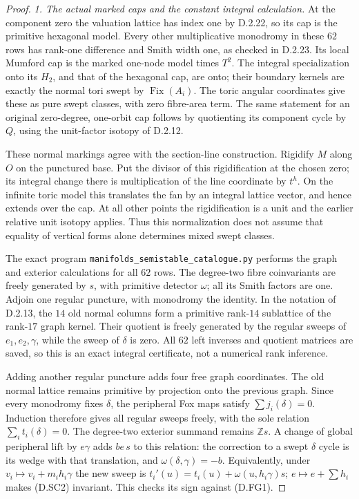 \begin{proof}
\emph{1. The actual marked caps and the constant integral calculation.}
At the component zero the valuation lattice has index one by D.2.22,
so its cap is the primitive hexagonal model. Every other
multiplicative monodromy in these $62$ rows has rank-one difference
and Smith width one, as checked in D.2.23. Its local Mumford cap is
the marked one-node model times $T^2$. The integral specialization
onto its $H_2$, and that of the hexagonal cap, are onto; their
boundary kernels are exactly the normal tori swept by
$\operatorname{Fix}(A_i)$. The toric angular coordinates give these
as pure swept classes, with zero fibre-area term. The same statement
for an original zero-degree, one-orbit cap follows by quotienting
its component cycle by $Q$, using the unit-factor isotopy of D.2.12.

These normal markings agree with the section-line construction.
Rigidify $M$ along $O$ on the punctured base. Put the divisor of this
rigidification at the chosen zero; its integral change there is
multiplication of the line coordinate by $t^h$. On the infinite
toric model this translates the fan by an integral lattice vector,
and hence extends over the cap. At all other points the
rigidification is a unit and the earlier relative unit isotopy
applies. Thus this normalization does not assume that equality of
vertical forms alone determines mixed swept classes.

The exact program \texttt{manifolds\_semistable\_catalogue.py}
performs the graph and exterior calculations for all $62$ rows.
The degree-two fibre coinvariants are freely generated by $s$,
with primitive detector $\omega$; all its Smith factors are one.
Adjoin one regular puncture, with monodromy the identity. In the
notation of D.2.13, the $14$ old normal columns form a primitive
rank-$14$ sublattice of the rank-$17$ graph kernel. Their quotient
is freely generated by the regular sweeps of $e_1,e_2,\gamma$,
while the sweep of $\delta$ is zero. All $62$ left inverses and
quotient matrices are saved, so this is an exact integral
certificate, not a numerical rank inference.

Adding another regular puncture adds four free graph coordinates.
The old normal lattice remains primitive by projection onto the
previous graph. Since every monodromy fixes $\delta$, the peripheral
Fox maps satisfy $\sum j_i(\delta)=0$. Induction therefore gives
all regular sweeps freely, with the sole relation
$\sum_i t_i(\delta)=0$. The degree-two exterior summand remains
$\mathbb Zs$. A change of global peripheral lift by $e\gamma$
adds $be\,s$ to this relation: the correction to a swept $\delta$
cycle is its wedge with that translation, and
$\omega(\delta,\gamma)=-b$. Equivalently, under
$v_i\mapsto v_i+m_i h_i\gamma$ the new sweep is
$t_i'(u)=t_i(u)+\omega(u,h_i\gamma)s$;
$e\mapsto e+\sum h_i$ makes (D.SC2) invariant. This checks its
sign against (D.FG1).


\end{proof}
